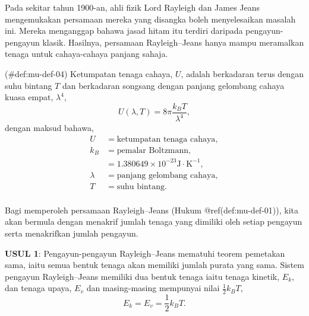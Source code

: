 \documentclass[
]{book}
\begin{document}
Pada sekitar tahun 1900-an, ahli fizik Lord Rayleigh dan James Jeans
mengemukakan persamaan mereka yang disangka boleh menyelesaikan masalah
ini. Mereka menganggap bahawa jasad hitam itu terdiri daripada
pengayun-pengayun klasik. Hasilnya, persamaan Rayleigh--Jeans hanya
mampu meramalkan tenaga untuk cahaya-cahaya panjang sahaja.

\BeginKnitrBlock{definition}{}

\protect\hypertarget{def:mu-def-04}{}{(\#def:mu-def-04) {} }Ketumpatan tenaga cahaya, \(U\), adalah
berkadaran terus dengan suhu bintang \(T\) dan berkadaran songsang
dengan panjang gelombang cahaya kuasa empat, \(\lambda^4\),
\begin{equation}
U\left(\lambda,T\right) = 8\pi\frac{k_BT}{\lambda^4},
\end{equation} dengan maksud bahawa, \begin{equation*}
\begin{split}
U & = \text{ketumpatan tenaga cahaya},\\
k_B & = \text{pemalar Boltzmann},\\
&= 1.380649\times 10^{-23} \text{J}\cdot\text{K}^{-1},\\
\lambda & = \text{panjang gelombang cahaya},\\
T & = \text{suhu bintang}.\\
\end{split}
\end{equation*} 

\BeginKnitrBlock{proof}{}

{}Bagi memperoleh persamaan Rayleigh--Jeans (Hukum
@ref(def:mu-def-01)), kita akan bermula dengan menakrif jumlah tenaga
yang dimiliki oleh setiap pengayun serta menakrifkan jumlah pengayun.

\textbf{USUL 1}: Pengayun-pengayun Rayleigh--Jeans mematuhi teorem
pemetakan sama, iaitu semua bentuk tenaga akan memiliki jumlah purata
yang sama. Sistem pengayun Rayleigh--Jeans memiliki dua bentuk tenaga
iaitu tenaga kinetik, \(E_k\), dan tenaga upaya, \(E_v\) dan
masing-masing mempunyai nilai \(\frac{1}{2}{k_BT}\),
\[E_k = E_v = \frac{1}{2}{k_BT}.\]
\end{document}
